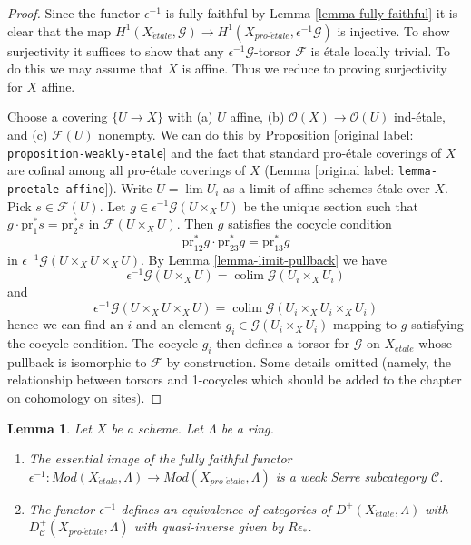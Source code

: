 \documentclass[10pt,a4paper]{article}
\theoremstyle{plain}
\newtheorem{lemma}[subsection]{Lemma}
\theoremstyle{definition}
\theoremstyle{remark}
\numberwithin{equation}{subsection}
\def\lim{\mathop{\mathrm{lim}}\nolimits}
\def\colim{\mathop{\mathrm{colim}}\nolimits}
\def\proetale{{pro\text{-}\acute{e}tale}}
\def\etale{{\acute{e}tale}}
\begin{document}
\begin{proof}
Since the functor $\epsilon^{-1}$ is fully faithful by
Lemma \ref{lemma-fully-faithful}
it is clear that the map
$H^1(X_\etale, \mathcal{G}) \to H^1(X_\proetale, \epsilon^{-1}\mathcal{G})$
is injective. To show surjectivity it suffices to show that
any $\epsilon^{-1}\mathcal{G}$-torsor $\mathcal{F}$ is \'etale
locally trivial. To do this we may assume that $X$ is affine.
Thus we reduce to proving surjectivity for $X$ affine.

\medskip\noindent
Choose a covering $\{U \to X\}$ with (a) $U$ affine, (b)
$\mathcal{O}(X) \to \mathcal{O}(U)$ ind-\'etale, and (c) $\mathcal{F}(U)$
nonempty. We can do this by Proposition [original label: \nolinkurl{proposition-weakly-etale}]
and the fact that
standard pro-\'etale coverings of $X$ are cofinal among all pro-\'etale
coverings of $X$ (Lemma [original label: \nolinkurl{lemma-proetale-affine}]).
Write $U = \lim U_i$ as a limit of affine schemes \'etale over $X$.
Pick $s \in \mathcal{F}(U)$. Let
$g \in \epsilon^{-1}\mathcal{G}(U \times_X U)$
be the unique section such that $g \cdot \text{pr}_1^*s = \text{pr}_2^*s$ in
$\mathcal{F}(U \times_X U)$. Then $g$ satisfies the cocycle condition
$$
\text{pr}_{12}^*g \cdot \text{pr}_{23}^*g = \text{pr}_{13}^*g
$$
in $\epsilon^{-1}\mathcal{G}(U \times_X U \times_X U)$. By
Lemma \ref{lemma-limit-pullback}
we have
$$
\epsilon^{-1}\mathcal{G}(U \times_X U) =
\colim \mathcal{G}(U_i \times_X U_i)
$$
and
$$
\epsilon^{-1}\mathcal{G}(U \times_X U \times_X U) =
\colim \mathcal{G}(U_i \times_X U_i \times_X U_i)
$$
hence we can find an $i$ and an element $g_i \in \mathcal{G}(U_i \times_X U_i)$
mapping to $g$ satisfying the cocycle condition.
The cocycle $g_i$ then defines a torsor for $\mathcal{G}$ on
$X_\etale$ whose pullback is isomorphic to $\mathcal{F}$
by construction. Some details omitted (namely, the relationship
between torsors and 1-cocycles which should be added to the chapter
on cohomology on sites).
\end{proof}

\begin{lemma}
\label{lemma-compare-derived}
Let $X$ be a scheme. Let $\Lambda$ be a ring.
\begin{enumerate}
\item The essential image of the fully faithful functor
$\epsilon^{-1} : \textit{Mod}(X_\etale, \Lambda) \to
\textit{Mod}(X_\proetale, \Lambda)$
is a weak Serre subcategory $\mathcal{C}$.
\item The functor $\epsilon^{-1}$ defines an equivalence of categories
of $D^+(X_\etale, \Lambda)$ with $D^+_\mathcal{C}(X_\proetale, \Lambda)$
with quasi-inverse given by $R\epsilon_*$.
\end{enumerate}
\end{lemma}
\end{document}
